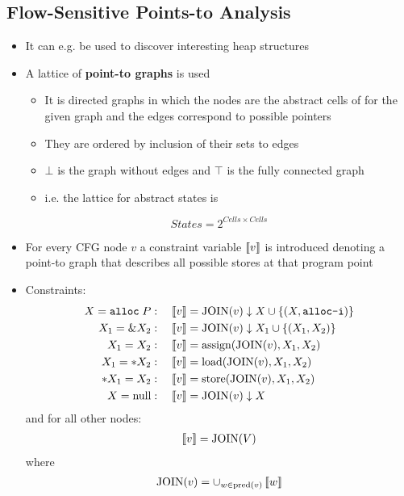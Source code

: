 \subsection{Flow-Sensitive Points-to Analysis}
\begin{itemize}
  \item It can e.g. be used to discover interesting heap structures
  \item A lattice of \textbf{point-to graphs} is used
  \begin{itemize}
  	\item It is directed graphs in which the nodes are the abstract cells of for the given graph and the edges correspond to possible pointers
  	\item They are ordered by inclusion of their sets to edges
  	\item $\bot$ is the graph without edges and $\top$ is the fully connected graph
  	\item i.e. the lattice for abstract states is 
  \end{itemize}
  \begin{equation*}
    States = 2^{Cells \times Cells}
  \end{equation*}
  \item For every CFG node $v$ a constraint variable $\left\llbracket v\right\rrbracket$ is introduced denoting a point-to graph that describes all possible stores at that program point
  \item Constraints:
  \begin{align*}
    X = \mathtt{alloc} \; P &: \quad \left\llbracket v\right\rrbracket = \text{JOIN}(v) \downarrow X \cup \{(X, \text{\texttt{alloc-i}})\} \\
    X_1 = \& X_2 &: \quad \left\llbracket v\right\rrbracket = \text{JOIN}(v) \downarrow X_1 \cup \{(X_1, X_2)\} \\
    X_1 = X_2 &: \quad \left\llbracket v\right\rrbracket = \text{assign}(\text{JOIN}(v), X_1, X_2)\\
    X_1 = *X_2 &: \quad \left\llbracket v\right\rrbracket = \text{load}(\text{JOIN}(v), X_1, X_2)\\
    *X_1 = X_2 &: \quad \left\llbracket v\right\rrbracket = \text{store}(\text{JOIN}(v), X_1, X_2)\\
    X = \text{null} &: \quad \left\llbracket v\right\rrbracket = \text{JOIN}(v)\downarrow X
  \end{align*}
  and for all other nodes:
  \begin{align*}
    \left\llbracket v\right\rrbracket = \text{JOIN}(V)
  \end{align*}
  where
  \begin{align*}
                 \text{JOIN}(v) &= \cup_{w \in \text{pred}(v)} \co{w} \\

\end{align*}
\end{itemize}
